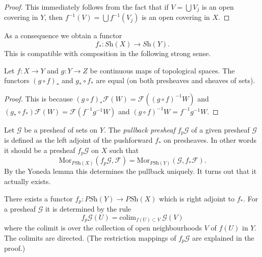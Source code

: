 \begin{proof}
This immediately follows from the fact that
if $V = \bigcup V_j$ is an open covering in $Y$,
then $f^{-1}(V) = \bigcup f^{-1}(V_j)$ is an open covering in $X$.
\end{proof}

\noindent
As a consequence we obtain a functor
$$
f_* : \textit{Sh}(X) \longrightarrow \textit{Sh}(Y).
$$
This is compatible with composition in the following
strong sense.

\begin{lemma}
\label{lemma-pushforward-composition}
Let $f : X \to Y$ and $g : Y \to Z$ be continuous maps
of topological spaces. The functors $(g \circ f)_*$
and $g_* \circ f_*$ are equal (on both presheaves
and sheaves of sets).
\end{lemma}

\begin{proof}
This is because $(g \circ f)_*\mathcal{F}(W) =
\mathcal{F}((g \circ f)^{-1}W)$ and
$(g_* \circ f_*)\mathcal{F}(W) = \mathcal{F}(f^{-1} g^{-1} W)$
and $(g \circ f)^{-1}W = f^{-1} g^{-1} W$.
\end{proof}

\noindent
Let $\mathcal{G}$ be a presheaf of sets on $Y$.
The {\it pullback presheaf} $f_p\mathcal{G}$
of a given presheaf $\mathcal{G}$ is defined as the left adjoint
of the pushforward $f_*$ on presheaves. In other words it
should be a presheaf $f_p \mathcal{G}$ on $X$ such that
$$
\text{Mor}_{\textit{PSh}(X)}(f_p\mathcal{G}, \mathcal{F})
=
\text{Mor}_{\textit{PSh}(Y)}(\mathcal{G}, f_*\mathcal{F}).
$$
By the Yoneda lemma this determines the pullback uniquely.
It turns out that it actually exists.

\begin{lemma}
\label{lemma-pullback-presheaves}
There exists a functor
$f_p : \textit{PSh}(Y) \to \textit{PSh}(X)$
which is right adjoint to $f_*$. For a presheaf
$\mathcal{G}$ it is determined by the rule
$$
f_p\mathcal{G}(U) = \text{colim}_{f(U) \subset V}\ \mathcal{G}(V)
$$
where the colimit is over the collection of open neighbourhoods
$V$ of $f(U)$ in $Y$. The colimits are directed. (The restriction
mappings of $f_p\mathcal{G}$ are explained in the proof.)
\end{lemma}

